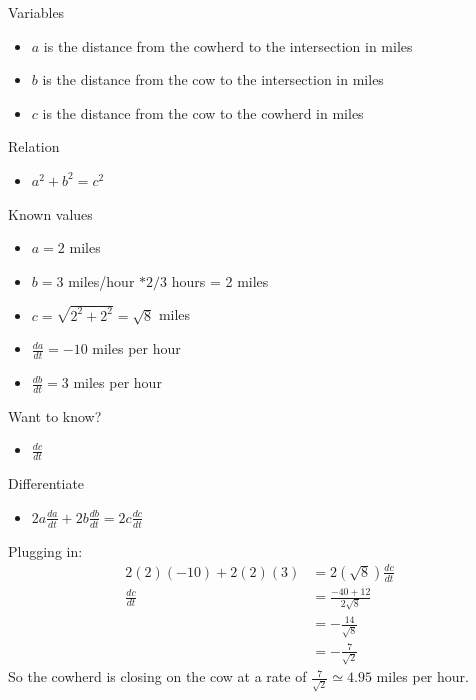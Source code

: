\documentclass{ximera}
\begin{document}
\begin{exercise}
\begin{hint}
Variables

\begin{itemize}
\item
  $a$ is the distance from the cowherd to the intersection in miles
\item
  $b$ is the distance from the cow to the intersection in miles
\item
  $c$ is the distance from the cow to the cowherd in miles
\end{itemize}

Relation

\begin{itemize}
\itemsep1pt\parskip0pt
\item
  $a^2+b^2 = c^2$
\end{itemize}

Known values

\begin{itemize}
\item
  $a = 2$ miles
\item
  $b = 3$ miles/hour $*2/3$ hours = 2 miles
\item
  $c = \sqrt{2^2+2^2} = \sqrt{8}$ miles
\item
  $\frac{da}{dt} = -10$ miles per hour
\item
  $\frac{db}{dt} = 3$ miles per hour
\end{itemize}

Want to know?

\begin{itemize}
\itemsep1pt\parskip0pt
\item
  $\frac{dc}{dt}$
\end{itemize}

Differentiate

\begin{itemize}
\itemsep1pt\parskip0pt
\item
  $2a\frac{da}{dt} + 2b\frac{db}{dt} = 2c\frac{dc}{dt}$
\end{itemize}

Plugging in: \begin{align*}
2(2)\left(-10\right) + 2(2)\left(3\right) &= 2(\sqrt{8})\frac{dc}{dt} \\
\frac{dc}{dt} &= \frac{-40+12}{2\sqrt{8}} \\
&= -\frac{14}{\sqrt{8}} \\
&= -\frac{7}{\sqrt{2}}
\end{align*} So the cowherd is closing on the cow at a rate of
$\frac{7}{\sqrt{2}} \simeq 4.95$ miles per hour.
\end{hint}


\begin{multipleChoice}
\end{multipleChoice}

\end{exercise}
\end{document}
